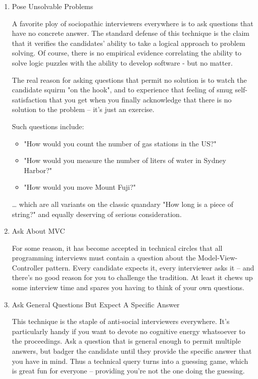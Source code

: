 \documentclass{article}
\begin{document}
\begin{enumerate}
\item Pose Unsolvable Problems
\label{sec:orgheadline63}

A favorite ploy of sociopathic interviewers everywhere is to ask
questions that have no concrete answer. The standard defense of this
technique is the claim that it verifies the candidates' ability to take
a logical approach to problem solving. Of course, there is no empirical
evidence correlating the ability to solve logic puzzles with the ability
to develop software - but no matter.

The real reason for asking questions that permit no solution is to watch
the candidate squirm "on the hook", and to experience that feeling of
smug self-satisfaction that you get when you finally acknowledge that
there is no solution to the problem -- it's just an exercise.

Such questions include:

\begin{itemize}
\item "How would you count the number of gas stations in the US?"
\item "How would you measure the number of liters of water in Sydney
Harbor?"
\item "How would you move Mount Fuji?"
\end{itemize}

\ldots{} which are all variants on the classic quandary "How long is a piece
of string?" and equally deserving of serious consideration.

\item Ask About MVC
\label{sec:orgheadline64}

For some reason, it has become accepted in technical circles that all
programming interviews must contain a question about the
Model-View-Controller pattern. Every candidate expects it, every
interviewer asks it -- and there's no good reason for you to challenge
the tradition. At least it chews up some interview time and spares you
having to think of your own questions.

\item Ask General Questions But Expect A Specific Answer
\label{sec:orgheadline65}

This technique is the staple of anti-social interviewers everywhere.
It's particularly handy if you want to devote no cognitive energy
whatsoever to the proceedings. Ask a question that is general enough to
permit multiple answers, but badger the candidate until they provide the
specific answer that you have in mind. Thus a technical query turns into
a guessing game, which is great fun for everyone -- providing you're not
the one doing the guessing.


\end{enumerate}
\end{document}
